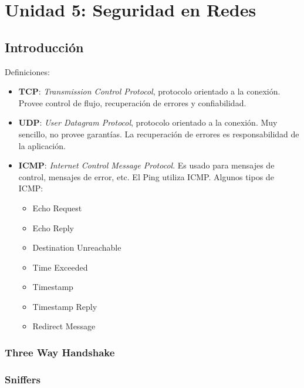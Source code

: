 \section{Unidad 5: Seguridad en Redes}

\subsection{Introducción}
Definiciones:

\begin{itemize}
	\item \textbf{TCP}: \textit{Transmission Control Protocol}, protocolo
	orientado a la conexión. Provee control de flujo, recuperación de errores
	y confiabilidad.
	\item \textbf{UDP}: \textit{User Datagram Protocol}, protocolo orientado
	a la conexión. Muy sencillo, no provee garantías. La recuperación de errores
	es responsabilidad de la aplicación.
	\item \textbf{ICMP}: \textit{Internet Control Message Protocol}. Es usado para
	mensajes de control, mensajes de error, etc. El Ping utiliza ICMP. Algunos tipos
	de ICMP:
		\begin{itemize}
			\item Echo Request
			\item Echo Reply
			\item Destination Unreachable
			\item Time Exceeded
			\item Timestamp
			\item Timestamp Reply
			\item Redirect Message
		\end{itemize}
\end{itemize}

\subsubsection{Three Way Handshake}


\subsubsection{Sniffers}

